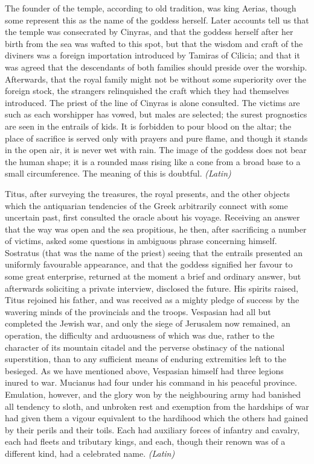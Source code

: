 
The founder of the temple, according to old tradition, was king Aerias, though some represent this as the name of the goddess herself. Later accounts tell us that the temple was consecrated by Cinyras, and that the goddess herself after her birth from the sea was wafted to this spot, but that the wisdom and craft of the diviners was a foreign importation introduced by Tamiras of Cilicia; and that it was agreed that the descendants of both families should preside over the worship. Afterwards, that the royal family might not be without some superiority over the foreign stock, the strangers relinquished the craft which they had themselves introduced. The priest of the line of Cinyras is alone consulted. The victims are such as each worshipper has vowed, but males are selected; the surest prognostics are seen in the entrails of kids. It is forbidden to pour blood on the altar; the place of sacrifice is served only with prayers and pure flame, and though it stands in the open air, it is never wet with rain. The image of the goddess does not bear the human shape; it is a rounded mass rising like a cone from a broad base to a small circumference. The meaning of this is doubtful. \emph{(Latin)}


Titus, after surveying the treasures, the royal presents, and the other objects which the antiquarian tendencies of the Greek arbitrarily connect with some uncertain past, first consulted the oracle about his voyage. Receiving an answer that the way was open and the sea propitious, he then, after sacrificing a number of victims, asked some questions in ambiguous phrase concerning himself. Sostratus (that was the name of the priest) seeing that the entrails presented an uniformly favourable appearance, and that the goddess signified her favour to some great enterprise, returned at the moment a brief and ordinary answer, but afterwards soliciting a private interview, disclosed the future. His spirits raised, Titus rejoined his father, and was received as a mighty pledge of success by the wavering minds of the provincials and the troops. Vespasian had all but completed the Jewish war, and only the siege of Jerusalem now remained, an operation, the difficulty and arduousness of which was due, rather to the character of its mountain citadel and the perverse obstinacy of the national superstition, than to any sufficient means of enduring extremities left to the besieged. As we have mentioned above, Vespasian himself had three legions inured to war. Mucianus had four under his command in his peaceful province. Emulation, however, and the glory won by the neighbouring army had banished all tendency to sloth, and unbroken rest and exemption from the hardships of war had given them a vigour equivalent to the hardihood which the others had gained by their perils and their toils. Each had auxiliary forces of infantry and cavalry, each had fleets and tributary kings, and each, though their renown was of a different kind, had a celebrated name. \emph{(Latin)}

